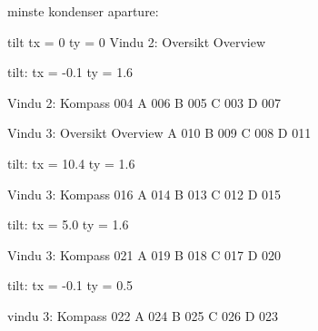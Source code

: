 minste kondenser aparture:

	tilt
	tx = 0
	ty = 0
		Vindu 2:
			Oversikt Overview

	tilt:
        tx = -0.1
        ty = 1.6

    Vindu 2:
        Kompass 004
        A 006
        B 005
        C 003
        D 007

    Vindu 3:
        Oversikt Overview
        A 010
        B 009
        C 008
        D 011

	tilt:
        tx = 10.4
        ty = 1.6
        
    Vindu 3:
        Kompass 016
        A 014
        B 013
        C 012
        D 015

	tilt:
        tx = 5.0
        ty = 1.6

    Vindu 3:
        Kompass 021
        A 019
        B 018
        C 017
        D 020

	tilt:
    	tx = -0.1
        ty = 0.5

	vindu 3:
        Kompass 022
		A 024
		B 025
		C 026
		D 023